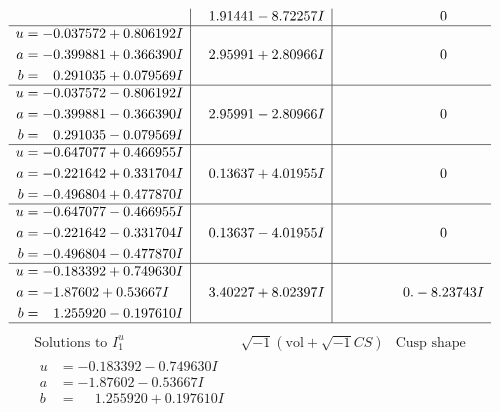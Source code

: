 \documentclass[1p]{elsarticle_modified}
\theoremstyle{definition}
\newcommand{\I}{\sqrt{-1}}
\begin{document}
$$\begin{array}{c|c|c}
 & \phantom{-}1.91441 - 8.72257 I & \phantom{-0.000000 } 0 \\ \hline\begin{aligned}
u &= -0.037572 + 0.806192 I \\
a &= -0.399881 + 0.366390 I \\
b &= \phantom{-}0.291035 + 0.079569 I\end{aligned}
 & \phantom{-}2.95991 + 2.80966 I & \phantom{-0.000000 } 0 \\ \hline\begin{aligned}
u &= -0.037572 - 0.806192 I \\
a &= -0.399881 - 0.366390 I \\
b &= \phantom{-}0.291035 - 0.079569 I\end{aligned}
 & \phantom{-}2.95991 - 2.80966 I & \phantom{-0.000000 } 0 \\ \hline\begin{aligned}
u &= -0.647077 + 0.466955 I \\
a &= -0.221642 + 0.331704 I \\
b &= -0.496804 + 0.477870 I\end{aligned}
 & \phantom{-}0.13637 + 4.01955 I & \phantom{-0.000000 } 0 \\ \hline\begin{aligned}
u &= -0.647077 - 0.466955 I \\
a &= -0.221642 - 0.331704 I \\
b &= -0.496804 - 0.477870 I\end{aligned}
 & \phantom{-}0.13637 - 4.01955 I & \phantom{-0.000000 } 0 \\ \hline\begin{aligned}
u &= -0.183392 + 0.749630 I \\
a &= -1.87602 + 0.53667 I \\
b &= \phantom{-}1.255920 - 0.197610 I\end{aligned}
 & \phantom{-}3.40227 + 8.02397 I & \phantom{-0.000000 } 0. - 8.23743 I\\
 \hline 
 \end{array}$$\newpage$$\begin{array}{c|c|c}  
\text{Solutions to }I^u_{1}& \I (\text{vol} + \sqrt{-1}CS) & \text{Cusp shape}\\
 \hline 
\begin{aligned}
u &= -0.183392 - 0.749630 I \\
a &= -1.87602 - 0.53667 I \\
b &= \phantom{-}1.255920 + 0.197610 I\end{aligned}

\end{array}$$
\end{document}
